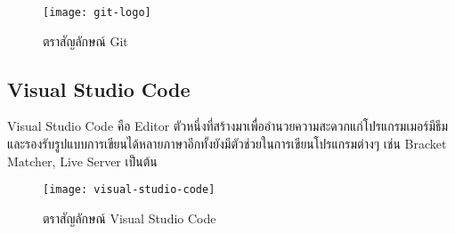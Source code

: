         \begin{figure}[H]
            \centering
            \texttt{[image: git-logo]}
            \caption{ตราสัญลักษณ์ Git}\label{git-logo}
        \end{figure}

    \subsection{Visual Studio Code}
        Visual Studio Code คือ Editor ตัวหนึ่งที่สร้างมาเพื่ออำนวยความสะดวกแก่โปรแกรมเมอร์มีธีมและรองรับรูปแบบการเขียนได้หลายภาษาอีกทั้งยังมีตัวช่วยในการเขียนโปรแกรมต่างๆ เช่น Bracket Matcher, Live Server เป็นต้น

        \begin{figure}[H]
            \centering
            \texttt{[image: visual-studio-code]}
            \caption{ตราสัญลักษณ์ Visual Studio Code}\label{visual-studio-code}
        \end{figure}